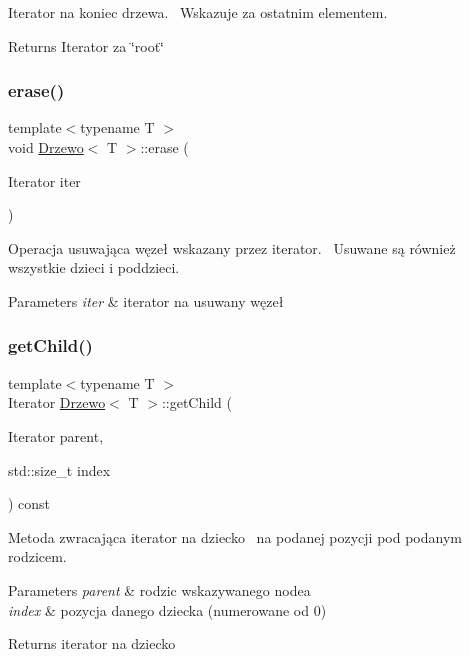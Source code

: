 Iterator na koniec drzewa.~\newline
Wskazuje za ostatnim elementem. \begin{DoxyReturn}{Returns}
Iterator za \char`\"{}root\char`\"{} 
\end{DoxyReturn}
\mbox{\label{class_drzewo_a34da2244db4e0ddfaa094d856099b091}} 
\subsubsection{\texorpdfstring{erase()}{erase()}}
{\footnotesize\ttfamily template$<$typename T $>$ \\
void \hyperlink{class_drzewo}{Drzewo}$<$ T $>$\+::erase (\begin{DoxyParamCaption}\item[{Iterator}]{iter }\end{DoxyParamCaption})\hspace{0.3cm}{\ttfamily [inline]}}

Operacja usuwająca węzeł wskazany przez iterator.~\newline
Usuwane są również wszystkie dzieci i poddzieci. 
\begin{DoxyParams}{Parameters}
{\em iter} & iterator na usuwany węzeł \\
\hline
\end{DoxyParams}
\mbox{\label{class_drzewo_aa82184dbff4418f916378bb2d861012e}} 
\subsubsection{\texorpdfstring{get\+Child()}{getChild()}}
{\footnotesize\ttfamily template$<$typename T $>$ \\
Iterator \hyperlink{class_drzewo}{Drzewo}$<$ T $>$\+::get\+Child (\begin{DoxyParamCaption}\item[{Iterator}]{parent,  }\item[{std\+::size\+\_\+t}]{index }\end{DoxyParamCaption}) const\hspace{0.3cm}{\ttfamily [inline]}}

Metoda zwracająca iterator na dziecko~\newline
na podanej pozycji pod podanym rodzicem. 
\begin{DoxyParams}{Parameters}
{\em parent} & rodzic wskazywanego node\textquotesingle{}a \\
\hline
{\em index} & pozycja danego dziecka (numerowane od 0) \\
\hline
\end{DoxyParams}
\begin{DoxyReturn}{Returns}
iterator na dziecko 
\end{DoxyReturn}
\mbox{\label{class_drzewo_a4ce176ba0ad39902d681d900c4b6163d}} 
